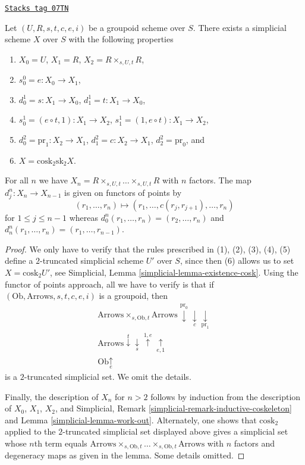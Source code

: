 \begin{lemma}
\label{spaces-simplicial-lemma-groupoid-simplicial}
\href{https://stacks.math.columbia.edu/tag/07TN}{\texttt{Stacks tag 07TN}}

Let $(U, R, s, t, c, e, i)$ be a groupoid scheme over $S$.
There exists a simplicial scheme $X$ over $S$
with the following properties
\begin{enumerate}
\item $X_0 = U$, $X_1 = R$, $X_2 = R \times_{s, U, t} R$,
\item $s_0^0 = e : X_0 \to X_1$,
\item $d^1_0 = s : X_1 \to X_0$, $d^1_1 = t : X_1 \to X_0$,
\item $s_0^1 = (e \circ t, 1) : X_1 \to X_2$,
$s_1^1 = (1, e \circ t) : X_1 \to X_2$,
\item $d^2_0 = \text{pr}_1 : X_2 \to X_1$,
$d^2_1 = c : X_2 \to X_1$,
$d^2_2 = \text{pr}_0$, and
\item $X = \text{cosk}_2 \text{sk}_2 X$.
\end{enumerate}
For all $n$ we have $X_n = R \times_{s, U, t} \ldots \times_{s, U, t} R$
with $n$ factors. The map $d^n_j : X_n \to X_{n - 1}$ is given on
functors of points by
$$
(r_1, \ldots, r_n) \longmapsto (r_1, \ldots, c(r_j, r_{j + 1}), \ldots, r_n)
$$
for $1 \leq j \leq n - 1$ whereas
$d^n_0(r_1, \ldots, r_n) = (r_2, \ldots, r_n)$ and
$d^n_n(r_1, \ldots, r_n) = (r_1, \ldots, r_{n - 1})$.
\end{lemma}

\begin{proof}
We only have to verify that the rules prescribed in (1), (2), (3), (4), (5)
define a $2$-truncated simplicial scheme $U'$ over $S$, since then (6)
allows us to set $X = \text{cosk}_2 U'$, see
Simplicial, Lemma \ref{simplicial-lemma-existence-cosk}.
Using the functor of points approach, all we have to verify is that
if $(\text{Ob}, \text{Arrows}, s, t, c, e, i)$ is a groupoid, then
$$
\begin{array}{c}\text{Arrows} \times_{s, \text{Ob}, t} \text{Arrows}
\overset{\text{pr}_0}{\downarrow}\underset{c}{\downarrow}\underset{\text{pr}_1}{\downarrow} \\ \text{Arrows}
\overset{t}{\downarrow}\underset{s}{\downarrow}\overset{1, e}{\uparrow}\underset{e, 1}{\uparrow} \\ \text{Ob}
\underset{e}{\uparrow}\end{array}
$$
is a $2$-truncated simplicial set. We omit the details.

\medskip\noindent
Finally, the description of $X_n$ for $n > 2$ follows by induction from
the description of $X_0$, $X_1$, $X_2$, and
Simplicial, Remark \ref{simplicial-remark-inductive-coskeleton} and
Lemma \ref{simplicial-lemma-work-out}. Alternately, one shows that
$\text{cosk}_2$ applied to the $2$-truncated simplicial set displayed above
gives a simplicial set whose $n$th term equals
$\text{Arrows} \times_{s, \text{Ob}, t} \ldots \times_{s, \text{Ob}, t}
\text{Arrows}$ with $n$ factors and degeneracy maps as given in the lemma.
Some details omitted.
\end{proof}

